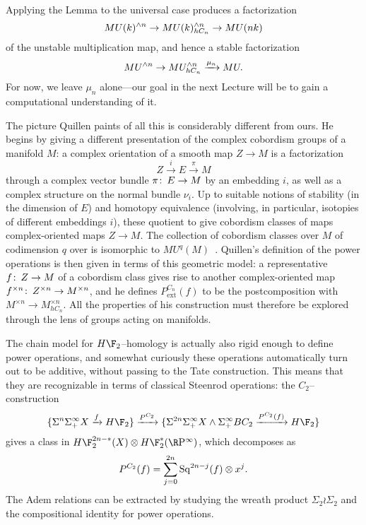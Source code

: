 Applying the Lemma to the universal case produces a factorization \[MU(k)^{\wedge n} \to MU(k)^{\wedge n}_{hC_n} \to MU(nk)\] of the unstable multiplication map, and hence a stable factorization \[MU^{\wedge n} \to MU^{\wedge n}_{hC_n} \xrightarrow{\mu_n} MU.\]  For now, we leave $\mu_n$ alone---our goal in the next Lecture will be to gain a computational understanding of it.

\begin{remark}
The picture Quillen paints of all this is considerably different from ours.  He begins by giving a different presentation of the complex cobordism groups of a manifold $M$: a complex orientation of a smooth map $Z \to M$ is a factorization \[Z \xrightarrow{i} E \xrightarrow{\pi} M\] through a complex vector bundle $\pi\colon\thinspace E \to M$ by an embedding $i$, as well as a complex structure on the normal bundle $\nu_i$.  Up to suitable notions of stability (in the dimension of $E$) and homotopy equivalence (involving, in particular, isotopies of different embeddings $i$), these quotient to give cobordism classes of maps complex-oriented maps $Z \to M$.  The collection of cobordism classes over $M$ of codimension $q$ over is isomorphic to $MU^q(M)$~\cite[Proposition 1.2]{Quillen}.  Quillen's definition of the power operations is then given in terms of this geometric model: a representative $f\colon\thinspace Z \to M$ of a cobordism class gives rise to another complex-oriented map $f^{\times n}\colon\thinspace Z^{\times n} \to M^{\times n}$, and he defines $P^{C_n}_{\mathrm{ext}}(f)$ to be the postcomposition with $M^{\times n} \to M^{\times n}_{hC_n}$.  All the properties of his construction must therefore be explored through the lens of groups acting on manifolds.
\end{remark}

\begin{example}
The chain model for $H\F_2$--homology is actually also rigid enough to define power operations, and somewhat curiously these operations automatically turn out to be additive, without passing to the Tate construction.  This means that they are recognizable in terms of classical Steenrod operations: the $C_2$--construction \[\{\Susp^n \Susp^\infty_+ X \xrightarrow{f} H\F_2\} \xrightarrow{P^{C_2}} \{\Susp^{2n} \Susp^\infty_+ X \sm \Susp^\infty_+ BC_2 \xrightarrow{P^{C_2}(f)} H\F_2\}\] gives a class in $H\F_2^{2n-*}(X) \otimes H\F_2^*(\RP^\infty)$, which decomposes as \[P^{C_2}(f) = \sum_{j=0}^{2n} \operatorname{Sq}^{2n-j}(f) \otimes x^j.\]  The Adem relations can be extracted by studying the wreath product $\Sigma_2 \wr \Sigma_2$ and the compositional identity for power operations.
\end{example}

